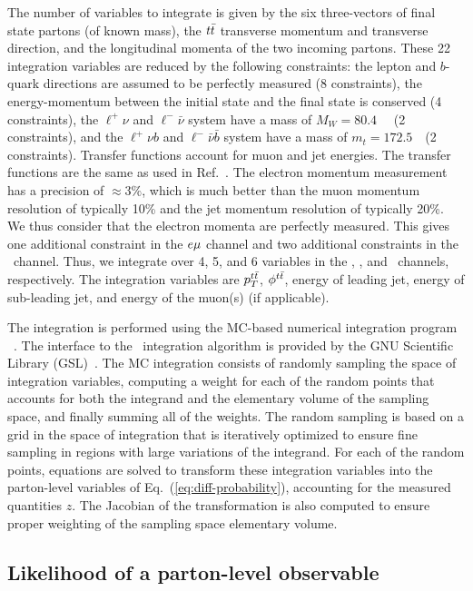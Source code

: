 \documentclass[aps,prd,twocolumn,showpacs,superscriptaddress,groupedaddress,floatfix]{revtex4}
\begin{document}
The number of variables to integrate is  
given by the six three-vectors of final state partons (of known mass),
the  $t\bar{t}$ transverse momentum and transverse direction, and the longitudinal momenta of the two incoming partons.
These 22 integration variables are reduced by the following constraints:
the lepton and $b$-quark directions are assumed to be perfectly measured
(8 constraints),
the energy-momentum  between the initial state and  the final state is conserved (4 constraints), 
the $\ell^+\nu$ and $\ell^-\bar{\nu}$ system have a mass of  $M_W=80.4$~\gev~\cite{Agashe:2014kda} (2 constraints),
and the $\ell^+\nu b $ and $\ell^-\bar{\nu}\bar b$ system have a mass of  $m_t=172.5$~\gev\ (2 constraints).
Transfer functions account for muon and jet energies.
The transfer functions  are the same as used in Ref.~\cite{Abazov:2015spa}.
The electron momentum measurement has a precision of $\approx 3\%$,
which is much better than the muon momentum resolution of typically 10\% and the jet momentum resolution of  typically 20\%.
We thus consider that the electron momenta are perfectly measured.
This gives one additional constraint in the $e\mu$ channel and two additional constraints in the \ee\ channel.
Thus, we integrate over 4, 5, and 6 variables in the \ee, \emu, and \mumu\ channels, respectively.
The integration variables are
 $ p^{t\bar{t}}_T$,
 $\phi^{t\bar{t}}$,
 energy of leading jet,
energy of sub-leading jet,
and  energy of the muon(s) (if applicable).

\label{sec:vegas_implementation}
The integration is performed using the MC-based 
numerical integration program \vegas~\cite{bib:VEGAS1,bib:VEGAS2}.
The interface to the \vegas\ integration algorithm is provided by the
GNU Scientific Library (GSL)~\cite{bib:GSL}. The MC integration consists of randomly sampling the space of integration variables, computing a weight for each of the random points that accounts for both
the integrand and the elementary volume of the sampling space, and finally summing all of the weights. 
The random sampling is based on a grid in the space of integration that is
iteratively  optimized to ensure fine sampling in regions with
large variations of the integrand.
For each of the random points, equations are solved to transform
these integration variables into the parton-level variables of Eq.~(\ref{eq:diff-probability}),   accounting for the measured quantities $z$.
The Jacobian of the transformation  is also computed to ensure proper weighting of the sampling space elementary volume.

\subsection{Likelihood of a parton-level observable}
\label{subsec:likelihoodME}
\end{document}
